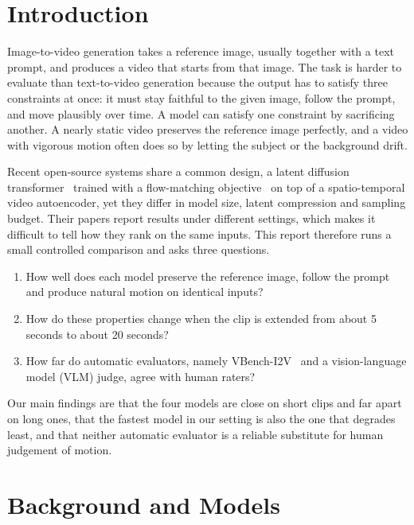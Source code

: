 \documentclass[11pt,a4paper]{article}
\begin{document}
\section{Introduction}
Image-to-video generation takes a reference image, usually together with a text prompt, and produces a video that starts from that image. The task is harder to evaluate than text-to-video generation because the output has to satisfy three constraints at once: it must stay faithful to the given image, follow the prompt, and move plausibly over time. A model can satisfy one constraint by sacrificing another. A nearly static video preserves the reference image perfectly, and a video with vigorous motion often does so by letting the subject or the background drift.

Recent open-source systems share a common design, a latent diffusion transformer~\citep{peebles2023dit} trained with a flow-matching objective~\citep{lipman2023flow} on top of a spatio-temporal video autoencoder, yet they differ in model size, latent compression and sampling budget. Their papers report results under different settings, which makes it difficult to tell how they rank on the same inputs. This report therefore runs a small controlled comparison and asks three questions.
\begin{enumerate}
  \item How well does each model preserve the reference image, follow the prompt and produce natural motion on identical inputs?
  \item How do these properties change when the clip is extended from about 5 seconds to about 20 seconds?
  \item How far do automatic evaluators, namely VBench-I2V~\citep{huang2024vbench,huang2024vbenchpp} and a vision-language model (VLM) judge, agree with human raters?
\end{enumerate}

Our main findings are that the four models are close on short clips and far apart on long ones, that the fastest model in our setting is also the one that degrades least, and that neither automatic evaluator is a reliable substitute for human judgement of motion.

\section{Background and Models}
\label{sec:models}
\end{document}
